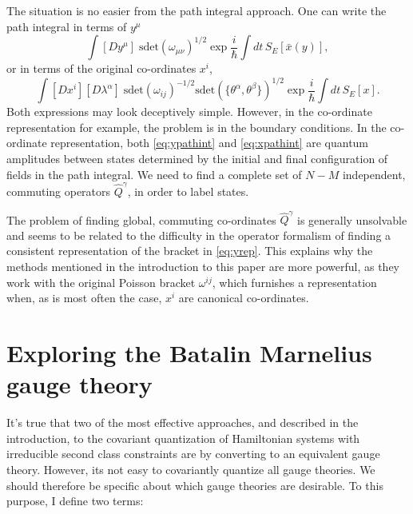 \documentclass[a4paper,12pt]{article}
\theoremstyle{definition}
\theoremstyle{remark}
\numberwithin{equation}{section}
\newcommand{\al}{\alpha}
\newcommand{\be}{\beta}
\newcommand{\ga}{\gamma}
\newcommand{\la}{\lambda}
\newcommand{\om}{\omega}
\newcommand{\bx}{\bar{x}}
\begin{document}
The situation is no easier from the path integral approach. One
can write the path integral in terms of $y^\mu$
\begin{equation}\label{eq:ypathint}
\int{[Dy^\mu]\; \text{sdet}(\om_{\mu\nu})^{1/2}
\exp{\frac{i}{\hbar}\int{dt \, S_E[\bx(y)]}}},
\end{equation}
or in terms of the original co-ordinates $x^i$,
\begin{equation}\label{eq:xpathint}
\int{[Dx^i] [D\la^{\al}]\; \text{sdet}(\om_{ij})^{-1/2}
\text{sdet}(\{\theta^\al,\theta^\be\})^{1/2}
\exp{\frac{i}{\hbar}\int{dt \, S_E[x]}}}.
\end{equation}
Both expressions may look deceptively simple. However, in the
co-ordinate representation for example, the problem is in the
boundary conditions. In the co-ordinate representation, both
\eqref{eq:ypathint} and \eqref{eq:xpathint} are quantum amplitudes
between states determined by the initial and final configuration
of fields in the path integral. We need to find a complete set of
$N-M$ independent, commuting operators $\hat{Q}^{\ga}$, in order
to label states.


The problem of finding global, commuting co-ordinates
$\hat{Q}^{\ga}$ is generally unsolvable and seems to be related to
the difficulty in the operator formalism of finding a consistent
representation of the bracket in \eqref{eq:yrep}. This explains why
the methods mentioned in the introduction to this paper are more
powerful, as they work with the original Poisson bracket
$\om^{ij}$, which furnishes a representation when, as is most often
the case, $x^i$ are canonical co-ordinates.




\section{Exploring the Batalin Marnelius gauge theory}
\label{sec:exploreBM}

It's true that two of the most effective approaches,
\cite{Batalin:1987fm,Batalin:1990mb,Batalin:1991jm} and
\cite{Harada:1990aj,Mitra:1990mp} described in the introduction,
to the covariant quantization of Hamiltonian systems with
irreducible second class constraints are by converting to an
equivalent gauge theory. However, its not easy to covariantly
quantize all gauge theories. We should therefore be specific about
which gauge theories are desirable. To this purpose, I define two
terms:
\end{document}
